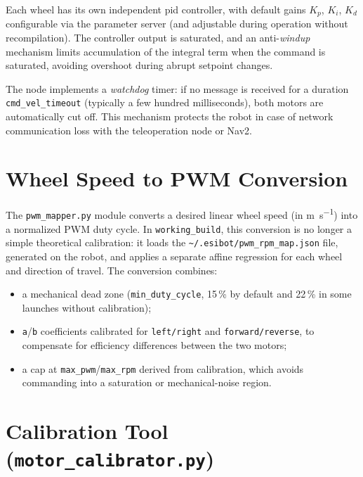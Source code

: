 Each wheel has its own independent \gls{pid} controller, with default gains $K_p$,
$K_i$, $K_d$ configurable via the \ros{} parameter server (and adjustable during
operation without recompilation). The controller output is saturated, and an
anti-\emph{windup} mechanism limits accumulation of the integral term when the command is
saturated, avoiding overshoot during abrupt setpoint changes.

\begin{notebox}[title={Safety Loop}]
	The node implements a \emph{watchdog} timer: if no  message is
	received for a duration \texttt{cmd\_vel\_timeout} (typically a few hundred
	milliseconds), both motors are automatically cut off. This mechanism protects the
	robot in case of network communication loss with the teleoperation node or Nav2.
\end{notebox}

\section{Wheel Speed to PWM Conversion}
\label{sec:cbn_pwm_mapper}

The \texttt{pwm\_mapper.py} module converts a desired linear wheel speed (in
\unit{\metre\per\second}) into a normalized PWM duty cycle. In \texttt{working\_build},
this conversion is no longer a simple theoretical calibration: it loads the
\texttt{\textasciitilde/.esibot/pwm\_rpm\_map.json} file, generated on the robot, and
applies a separate affine regression for each wheel and direction of travel. The
conversion combines:
\begin{itemize}
	\item a mechanical dead zone (\texttt{min\_duty\_cycle}, 15\,\% by default and 22\,\%
	      in some launches without calibration);
	\item \texttt{a}/\texttt{b} coefficients calibrated for \texttt{left/right} and
	      \texttt{forward/reverse}, to compensate for efficiency differences between the
	      two motors;
	\item a cap at \texttt{max\_pwm}/\texttt{max\_rpm} derived from calibration, which
	      avoids commanding into a saturation or mechanical-noise region.
\end{itemize}

\section{Calibration Tool (\texttt{motor\_calibrator.py})}
\label{sec:cbn_calibrator}

